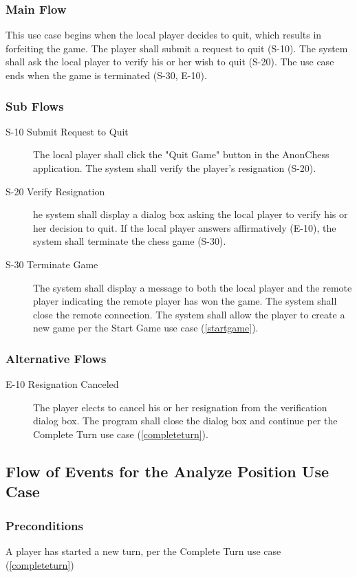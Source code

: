\subsubsection{Main Flow}
This use case begins when the local player decides to quit, which results in forfeiting the game.  The player shall submit a request to quit (S-10).  The system shall ask the local player to verify his or her wish to quit (S-20). The use case ends when the game is terminated (S-30, E-10).
\subsubsection{Sub Flows}
\begin{description}
\item[S-10 Submit Request to Quit] The local player shall click the "Quit Game" button in the AnonChess application.  The system shall verify the player's resignation (S-20).
\item[S-20 Verify Resignation] he system shall display a dialog box asking the local player to verify his or her decision to quit.  If the local player answers affirmatively (E-10), the system shall terminate the chess game (S-30).
\item[S-30 Terminate Game] The system shall display a message to both the local player and the remote player indicating the remote player has won the game.  The system shall close the remote connection.  The system shall allow the player to create a new game per the Start Game use case (\ref{startgame}). 
\end{description}
\subsubsection{Alternative Flows}
\begin{description}
\item[E-10 Resignation Canceled] The player elects to cancel his or her resignation from the verification dialog box. The program shall close the dialog box and continue per the Complete Turn use case (\ref{completeturn}). 
\end{description}

\subsection{Flow of Events for the Analyze Position Use Case }
\label{analpos}
\subsubsection{Preconditions}
 A player has started a new turn, per the Complete Turn use case (\ref{completeturn})
